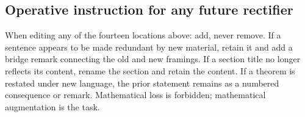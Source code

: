 \subsection*{Operative instruction for any future rectifier}

When editing any of the fourteen locations above: add, never
remove. If a sentence appears to be made redundant by new
material, retain it and add a bridge remark connecting the old
and new framings. If a section title no longer reflects its
content, rename the section and retain the content. If a
theorem is restated under new language, the prior statement
remains as a numbered consequence or remark. Mathematical loss
is forbidden; mathematical augmentation is the task.
